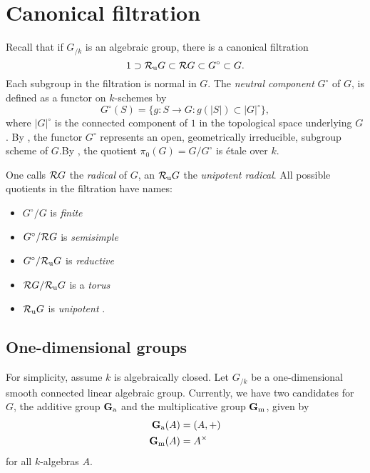 
\section{Canonical filtration}

Recall that if $G_{/k}$ is an algebraic group, there is a canonical filtration 
\[
  1\supset \mathcal{R}_\mathrm{u} G\subset \mathcal{R} G\subset G^\circ \subset G .
\]
Each subgroup in the filtration is normal in $G$. The \emph{neutral 
component} $G^\circ$ of $G$, is defined as a functor on $k$-schemes by 
\[
  G^\circ(S) = \{g:S\to G:g(|S|)\subset |G|^\circ\} ,
\]
where $|G|^\circ$ is the connected component of $1$ in the topological space 
underlying $G$. By \cite[VI\textsubscript{A} 2.3.1, 2.4]{sga3-i}, the functor $G^\circ$ 
represents an open, geometrically irreducible, subgroup scheme of $G$.By 
\cite[VI\textsubscript{A} 5.5.1]{sga3-i}, the quotient $\pi_0(G)=G/G^\circ$ is 
\'etale over $k$. 

One calls $\mathcal{R} G$ the \emph{radical} of $G$, an $\mathcal{R}_\mathrm{u} G$ the \emph{unipotent 
radical}. All possible quotients in the filtration have names: 
\begin{itemize}
  \item $G^\circ/G$ is \emph{finite}
  \item $G^\circ/\mathcal{R} G$ is \emph{semisimple}
  \item $G^\circ/\mathcal{R}_\mathrm{u} G$ is \emph{reductive}
  \item $\mathcal{R} G/\mathcal{R}_\mathrm{u} G$ is a \emph{torus}
  \item $\mathcal{R}_\mathrm{u} G$ is \emph{unipotent} .
\end{itemize}





\subsection{One-dimensional groups}

For simplicity, assume $k$ is algebraically closed. Let $G_{/k}$ be a 
one-dimensional smooth connected linear algebraic group. Currently, we have 
two candidates for $G$, the additive group $\mathbf{G}_\mathrm{a}$ and the multiplicative 
group $\mathbf{G}_\mathrm{m}$, given by 
\begin{align*}
  \mathbf{G}_\mathrm{a}(A) &= (A,+) \\
  \mathbf{G}_\mathrm{m}(A) &= A^\times 
\end{align*}
for all $k$-algebras $A$. 

